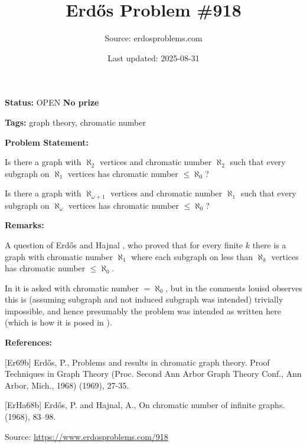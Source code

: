 \documentclass{article}
\title{Erd\H{o}s Problem \#918}
\date{Last updated: 2025-08-31}
\author{Source: erdosproblems.com}
\begin{document}
\maketitle

\noindent\textbf{Status:} OPEN \quad \textbf{No prize}

\noindent\textbf{Tags:} graph theory, chromatic number

\medskip
\noindent\textbf{Problem Statement:}

Is there a graph with $\aleph_2$ vertices and chromatic number $\aleph_2$ such that every subgraph on $\aleph_1$ vertices has chromatic number $\leq\aleph_0$?

Is there a graph with $\aleph_{\omega+1}$ vertices and chromatic number $\aleph_1$ such that every subgraph on $\aleph_\omega$ vertices has chromatic number $\leq\aleph_0$?

\bigskip
\noindent\textbf{Remarks:}

A question of Erd\H{o}s and Hajnal \cite{ErHa68b}, who proved that for every finite $k$ there is a graph with chromatic number $\aleph_1$ where each subgraph on less than $\aleph_k$ vertices has chromatic number $\leq \aleph_0$.

In \cite{Er69b} it is asked with chromatic number $=\aleph_0$, but in the comments louisd observes this is (assuming subgraph and not induced subgraph was intended) trivially impossible, and hence presumably the problem was intended as written here (which is how it is posed in \cite{ErHa68b}).

\bigskip
\noindent\textbf{References:}

[Er69b] Erd\H{o}s, P., Problems and results in chromatic graph theory. Proof Techniques in Graph Theory (Proc. Second Ann
Arbor Graph Theory Conf., Ann Arbor, Mich.,
1968) (1969), 27-35.
 
 [ErHa68b] Erd\H{o}s, P. and Hajnal, A., On chromatic number of infinite graphs. (1968), 83--98.

\bigskip
\noindent\small{Source: \url{https://www.erdosproblems.com/918}}
\end{document}
